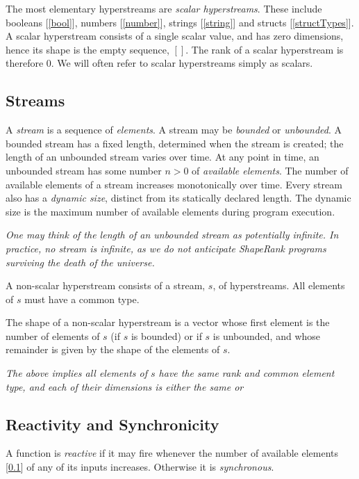 \documentclass{article}
\begin{document}
The most elementary hyperstreams are {\em scalar hyperstreams}. These include  booleans [\ref{bool}], numbers [\ref{number}], strings [\ref{string}] and  structs [\ref{structTypes}]. A scalar hyperstream consists of a single scalar value, and has zero dimensions, hence its shape is the empty sequence, $[]$. The rank of a scalar hyperstream is therefore $0$. We will often refer to scalar hyperstreams simply as scalars.

\subsection{Streams}
\label{streams}

A {\em stream} is a sequence of {\em elements}.  A stream may be {\em bounded} or {\em unbounded}. A bounded stream has a fixed length, determined when the stream is created; the length of an unbounded stream varies over time. At any point in time, an unbounded stream has some number $n \gt 0$ of {\em available elements}. The number of available elements of a stream increases monotonically over time. Every stream also has a {\em dynamic size}, distinct from its statically declared length. The dynamic size is the maximum number of available elements during program execution.

{\em One may think of the length of an unbounded stream as potentially infinite. In practice, no stream is infinite, as we do not anticipate ShapeRank programs surviving the death of the universe.
}

A non-scalar hyperstream consists of a stream, $s$, of hyperstreams. All elements of $s$ must have a common type.  

The shape of a non-scalar hyperstream is a vector whose first element is the number of elements of $s$ (if $s$ is bounded) or \QUESTIONMARK if $s$ is unbounded, and
whose remainder is given by the shape of the elements of $s$.

{\em The above implies all elements of $s$ have the same rank and common element type, and each of their dimensions is either the same or \QUESTIONMARK}


\subsection{Reactivity and Synchronicity}
\label{reactivityAndSynchronicity}

A function is {\em reactive} if it may fire whenever the number of available elements [\ref{streams}] of any of its inputs increases. Otherwise it is {\em synchronous}.
\end{document}
